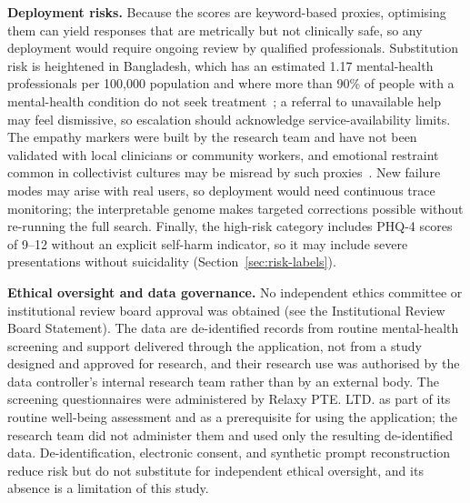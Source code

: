 \documentclass[mathematics,article,submit,xetex,moreauthors]{Definitions/mdpi}
\begin{document}
\textbf{Deployment risks.} Because the scores are keyword-based proxies,
optimising them can yield responses that are metrically but not clinically
safe, so any deployment would require ongoing review by qualified
professionals. Substitution risk is heightened in Bangladesh, which has an
estimated 1.17 mental-health professionals per 100{,}000 population and where
more than 90\% of people with a mental-health condition do not seek
treatment~\cite{koly2024stakeholder}; a referral to unavailable help may feel
dismissive, so escalation should acknowledge service-availability limits. The
empathy markers were built by the research team and have not been validated
with local clinicians or community workers, and emotional restraint common in
collectivist cultures may be misread by such proxies~\cite{ijca2025emotion}.
New failure modes may arise with real users, so deployment would need
continuous trace monitoring; the interpretable genome makes targeted
corrections possible without re-running the full search. Finally, the
high-risk category includes PHQ-4 scores of 9--12 without an explicit
self-harm indicator, so it may include severe presentations without
suicidality (Section~\ref{sec:risk-labels}).

\textbf{Ethical oversight and data governance.} No independent ethics committee
or institutional review board approval was obtained (see the Institutional
Review Board Statement). The data are de-identified records from routine
mental-health screening and support delivered through the application, not from
a study designed and approved for research, and their research use was
authorised by the data controller's internal research team rather than by an
external body. The screening questionnaires were administered by Relaxy PTE.
LTD. as part of its routine well-being assessment and as a prerequisite for
using the application; the research team did not administer them and used only
the resulting de-identified data. De-identification, electronic consent, and
synthetic prompt reconstruction reduce risk but do not substitute for
independent ethical oversight, and its absence is a limitation of this study. 
\end{document}
